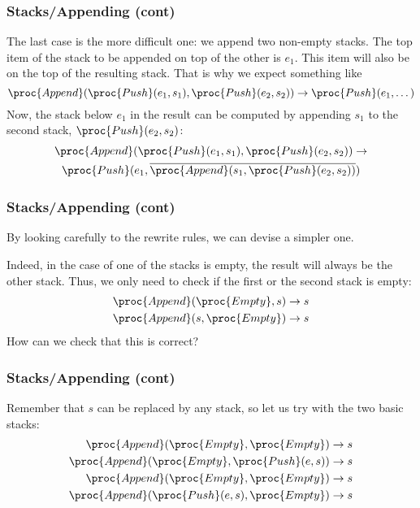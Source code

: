 %
\begin{frame}
\frametitle{Stacks/Appending (cont)}

The last case is the more difficult one: we append two non-empty
stacks. The top item of the stack to be appended on top of the other is
\(e_1\). This item will also be on the top of the resulting
stack. That is why we expect something like
\[
  \proc{Append} (\proc{Push} (e_1, s_1), \proc{Push} (e_2, s_2))
 \rightarrow \proc{Push} (e_1, \dots)
\]
Now, the stack below \(e_1\) in the result can be computed by
appending \(s_1\) to the second stack, \(\proc{Push} (e_2, s_2)\):
\begin{multline*}
\proc{Append} (\proc{Push} (e_1, s_1), \proc{Push} (e_2, s_2))
\rightarrow\\ \proc{Push} 
(e_1, \overline{\proc{Append} (s_1, \proc{Push} (e_2, s_2))})
\end{multline*}

\end{frame}

%
\begin{frame}
\frametitle{Stacks/Appending (cont)}

By looking carefully to the rewrite rules, we can devise a simpler
one.

\bigskip

Indeed, in the case of one of the stacks is empty, the result will
always be the other stack. Thus, we only need to check if the first or
the second stack is empty:
\begin{align*}
  \proc{Append} (\proc{Empty}, s) & \rightarrow s\\
  \proc{Append} (s, \proc{Empty}) & \rightarrow s
\end{align*}
How can we check that this is correct? 

\end{frame}

%
\begin{frame}
\frametitle{Stacks/Appending (cont)}

Remember that \(s\) can be replaced by any stack, so let us try with
the two basic stacks:
\begin{align*}
  \proc{Append} (\proc{Empty}, \proc{Empty}) & \rightarrow s\\
  \proc{Append} (\proc{Empty}, \proc{Push} (e, s)) & \rightarrow s\\
  \proc{Append} (\proc{Empty}, \proc{Empty}) & \rightarrow s\\
  \proc{Append} (\proc{Push} (e, s), \proc{Empty}) & \rightarrow s
\end{align*}

\end{frame}

